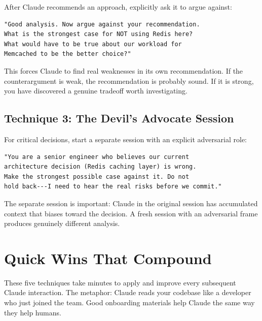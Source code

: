 After Claude recommends an approach, explicitly ask it to argue against:

\begin{verbatim}
"Good analysis. Now argue against your recommendation.
What is the strongest case for NOT using Redis here?
What would have to be true about our workload for
Memcached to be the better choice?"
\end{verbatim}

\noindent This forces Claude to find real weaknesses in its own
recommendation. If the counterargument is weak, the recommendation
is probably sound. If it is strong, you have discovered a genuine
tradeoff worth investigating.

\subsection*{Technique 3: The Devil's Advocate Session}

For critical decisions, start a separate session with an explicit
adversarial role:

\begin{verbatim}
"You are a senior engineer who believes our current
architecture decision (Redis caching layer) is wrong.
Make the strongest possible case against it. Do not
hold back---I need to hear the real risks before we commit."
\end{verbatim}

\noindent The separate session is important: Claude in the original
session has accumulated context that biases toward the decision.
A fresh session with an adversarial frame produces genuinely
different analysis.


\section{Quick Wins That Compound}
\label{sec:quick-wins}

These five techniques take minutes to apply and improve every subsequent
Claude interaction. The metaphor: Claude reads your codebase like a
developer who just joined the team. Good onboarding materials help
Claude the same way they help humans.

